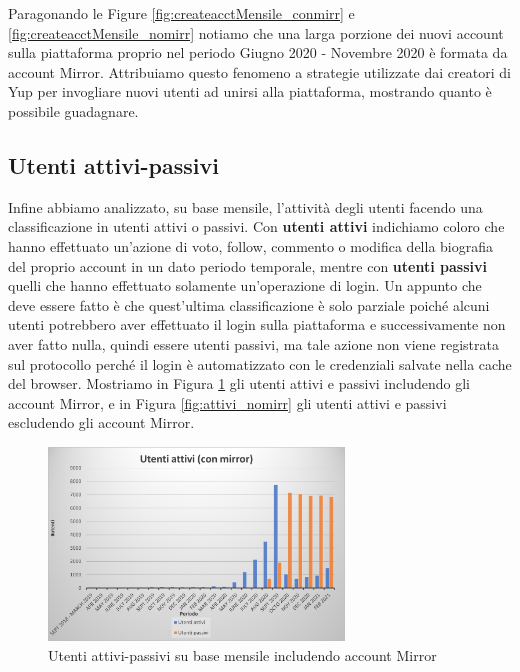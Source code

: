 Paragonando le Figure \ref{fig:createacctMensile_conmirr} e \ref{fig:createacctMensile_nomirr} notiamo che una larga porzione dei nuovi account sulla piattaforma proprio nel periodo Giugno 2020 - Novembre 2020 è formata da account Mirror.
Attribuiamo questo fenomeno a strategie utilizzate dai creatori di Yup per invogliare nuovi utenti ad unirsi alla piattaforma, mostrando quanto è possibile guadagnare.

\subsection{Utenti attivi-passivi}
Infine abbiamo analizzato, su base mensile, l'attività degli utenti facendo una classificazione in utenti attivi o passivi. Con \textbf{utenti attivi} indichiamo coloro che hanno effettuato un'azione di voto, follow, commento o modifica della biografia del proprio account in un dato periodo temporale, mentre con \textbf{utenti passivi} quelli che hanno effettuato solamente un'operazione di login. Un appunto che deve essere fatto è che quest'ultima classificazione è solo parziale poiché alcuni utenti potrebbero aver effettuato il login sulla piattaforma e successivamente non aver fatto nulla, quindi essere utenti passivi, ma tale azione non viene registrata sul protocollo perché il login è automatizzato con le credenziali salvate nella cache del browser. Mostriamo in Figura \ref{fig:attivi_conmirr} gli utenti attivi e passivi includendo gli account Mirror, e in Figura \ref{fig:attivi_nomirr} gli utenti attivi e passivi escludendo gli account Mirror.

\begin{figure}[t]
    \centering
    \includegraphics[width=0.7\textwidth]{graphs/utentiattivi.png}
    \caption{Utenti attivi-passivi su base mensile includendo account Mirror}
    \label{fig:attivi_conmirr}
\end{figure}

